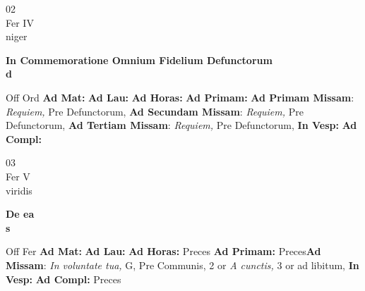 \documentclass[10pt, openany]{book}
\begin{document}
        \begin{center}
            \begin{minipage}{3.5in}
                \vspace{2em}
                \begin{minipage}{0.5in}
                    {\Huge 02} \\
                    {\normalsize Fer IV} \\
                    {\normalsize niger}
                \end{minipage}
                \begin{minipage}{3.0in}
                    \textbf{ \large In Commemoratione Omnium Fidelium Defunctorum \\
                    \textnormal{\normalsize d}} \\ 
                \end{minipage}
                \begin{justify}Off Ord
                    \textbf{Ad Mat: }
                    \textbf{Ad Lau: }
                    \textbf{Ad Horas: }
                    \textbf{Ad Primam: }\textbf{Ad Primam Missam}: \textit{Requiem,} Pre Defunctorum,  \textbf{Ad Secundam Missam}: \textit{Requiem,} Pre Defunctorum,  \textbf{Ad Tertiam Missam}: \textit{Requiem,} Pre Defunctorum,  
                    \textbf{In Vesp: }
                    \textbf{Ad Compl: }
                \end{justify}
            \end{minipage}
        \end{center}
    
        \begin{center}
            \begin{minipage}{3.5in}
                \vspace{2em}
                \begin{minipage}{0.5in}
                    {\Huge 03} \\
                    {\normalsize Fer V} \\
                    {\normalsize viridis}
                \end{minipage}
                \begin{minipage}{3.0in}
                    \textbf{ \large De ea \\
                    \textnormal{\normalsize s}} \\ 
                \end{minipage}
                \begin{justify}Off Fer
                    \textbf{Ad Mat: }
                    \textbf{Ad Lau: }
                    \textbf{Ad Horas: }Preces
                    \textbf{Ad Primam: }Preces\textbf{Ad Missam}: \textit{In voluntate tua,} G, Pre Communis, 2 or \textit{A cunctis,} 3 or ad libitum,  
                    \textbf{In Vesp: }
                    \textbf{Ad Compl: }Preces
                \end{justify}
            \end{minipage}
        \end{center}
    
\end{document}
